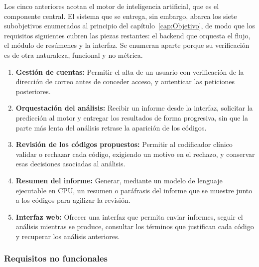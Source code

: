 Los cinco anteriores acotan el motor de inteligencia artificial, que es el componente central. El sistema que se entrega, sin embargo, abarca los siete subobjetivos enumerados al principio del capítulo~\ref{cap:Objetivo}, de modo que los requisitos siguientes cubren las piezas restantes: el backend que orquesta el flujo, el módulo de resúmenes y la interfaz. Se enumeran aparte porque su verificación es de otra naturaleza, funcional y no métrica.

\begin{enumerate}[resume, label=\textbf{RF\arabic*.}, leftmargin=*]
 \item \textbf{Gestión de cuentas:} Permitir el alta de un usuario con verificación de la dirección de correo antes de conceder acceso, y autenticar las peticiones posteriores.
 \item \textbf{Orquestación del análisis:} Recibir un informe desde la interfaz, solicitar la predicción al motor y entregar los resultados de forma progresiva, sin que la parte más lenta del análisis retrase la aparición de los códigos.
 \item \textbf{Revisión de los códigos propuestos:} Permitir al codificador clínico validar o rechazar cada código, exigiendo un motivo en el rechazo, y conservar esas decisiones asociadas al análisis.
 \item \textbf{Resumen del informe:} Generar, mediante un modelo de lenguaje ejecutable en CPU, un resumen o paráfrasis del informe que se muestre junto a los códigos para agilizar la revisión.
 \item \textbf{Interfaz web:} Ofrecer una interfaz que permita enviar informes, seguir el análisis mientras se produce, consultar los términos que justifican cada código y recuperar los análisis anteriores.
\end{enumerate}

\subsubsection{Requisitos no funcionales}

